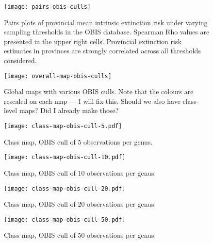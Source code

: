 \documentclass[11pt]{article}
\begin{document}
\clearpage

\begin{figure}[htbp]
\begin{center}
\texttt{[image: pairs-obis-culls]}
\caption{Pairs plots of provincial mean intrinsic extinction risk under varying sampling thresholds in the OBIS database. Spearman Rho values are presented in the upper right cells. Provincial extinction risk estimates in provinces are strongly correlated across all thresholds considered.}
\label{fig:pairs-prov-obis-culls}
\end{center}
\end{figure}

\clearpage

\begin{figure}[htbp]
\begin{center}
\texttt{[image: overall-map-obis-culls]}
\caption{Global maps with various OBIS culls. Note that the colours are rescaled on each map --- I will fix this. Should we also have class-level maps? Did I already make those?}
\label{fig:overall-maps-obis-culls}
\end{center}
\end{figure}

\begin{figure}[htbp]
\begin{center}
  \texttt{[image: class-map-obis-cull-5.pdf]}
\caption{Class map, OBIS cull of 5 observations per genus.}
\label{fig:class-map-obis-cull-5}
\end{center}
\end{figure}

\begin{figure}[htbp]
\begin{center}
  \texttt{[image: class-map-obis-cull-10.pdf]}
\caption{Class map, OBIS cull of 10 observations per genus.}
\label{fig:class-map-obis-cull-10}
\end{center}
\end{figure}

\begin{figure}[htbp]
\begin{center}
  \texttt{[image: class-map-obis-cull-20.pdf]}
\caption{Class map, OBIS cull of 20 observations per genus.}
\label{fig:class-map-obis-cull-20}
\end{center}
\end{figure}

\begin{figure}[htbp]
\begin{center}
  \texttt{[image: class-map-obis-cull-50.pdf]}
\caption{Class map, OBIS cull of 50 observations per genus.}
\label{fig:class-map-obis-cull-50}
\end{center}
\end{figure}
\end{document}
